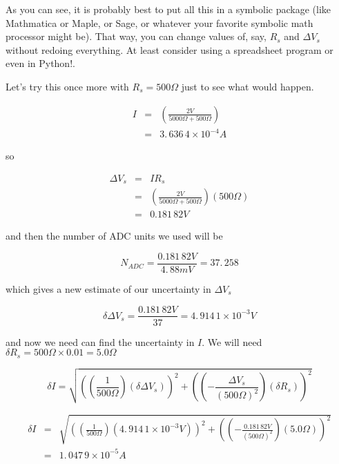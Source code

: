 As you can see, it is probably best to put all this in a symbolic package
(like Mathmatica or Maple, or Sage, or whatever your favorite symbolic math
processor might be). That way, you can change values of, say, $R_{s}$ and $\Delta V_{s}$ without redoing everything. At least consider using a spreadsheet program or even in Python!.

Let's try this once more with $R_{s}=500\unit{\Omega}$ just to see what would happen.

\begin{eqnarray*}
	I &=&\left( \frac{2\unit{V}}{5000\unit{\Omega}+500\unit{\Omega}}\right) \\
      &=&3.\,\allowbreak 636\,4\times 10^{-4}\unit{A}
\end{eqnarray*}

\noindent so

\begin{eqnarray*}
	\Delta V_{s} &=&IR_{s} \\
                 &=&\left( \frac{2\unit{V}}{5000\unit{\Omega}+500\unit{\Omega}}\right) \left( 500\unit{\Omega}\right) \\
                 &=&0.181\,82\unit{V}
\end{eqnarray*}

\noindent and then the number of ADC units we used will be 

\begin{equation*}
     N_{ADC}=\frac{0.181\,82\unit{V}}{4.\,\allowbreak 88\unit{mV}}=37.\,\allowbreak 258
\end{equation*}

\noindent which gives a new estimate of our uncertainty in $\Delta V_{s}$ 

\begin{equation*}
    \delta \Delta V_{s}=\frac{0.181\,82\unit{V}}{37}=4.\,\allowbreak914\,1\times 10^{-3}\unit{V}
\end{equation*}

\noindent and now we need can find the uncertainty in $I.$ We will need $\delta
R_{s}=500\unit{\Omega}\times 0.01=\allowbreak 5.0\unit{\Omega}$

\begin{equation*}
	\delta I=\sqrt{\left( \left( \frac{1}{500\unit{\Omega}}\right) \left( \delta \Delta V_{s}\right) \right) ^{2}+\left( \left( -\frac{\Delta V_{s}}{\left( 500\unit{\Omega}\right) ^{2}}\right) \left( \delta R_{s}\right) \right) ^{2}}
\end{equation*}

\begin{eqnarray*}
	\delta I &=&\sqrt{\left( \left( \frac{1}{500\unit{\Omega}}\right) \left( 4.\,\allowbreak 914\,1\times 10^{-3}\unit{V}\right) \right)^{2}+\left( \left( -\frac{0.181\,82\unit{V}}{\left( 500\unit{\Omega}\right) ^{2}}\right) \left( 5.0\unit{\Omega}\right) \right) ^{2}} \\
            &=&1.\,\allowbreak 047\,9\times 10^{-5}\unit{A}
\end{eqnarray*}

